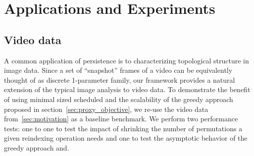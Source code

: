 \documentclass[sn-mathphys]{sn-jnl}
\begin{document}


\section{Applications and Experiments}\label{sec:results}
\subsection{Video data}
A common application of persistence is to characterizing topological structure in image data. Since a  set of ``snapshot'' frames of a video can be equivalently thought of as discrete 1-parameter family, our framework provides a natural extension of the typical image analysis to video data. 
To demonstrate the benefit of using minimal sized scheduled and the scalability of the greedy approach proposed in section~\ref{sec:proxy_objective}, we re-use the video data from~\ref{sec:motivation} as a baseline benchmark. We perform two performance tests: one to  one to test the impact of shrinking the number of permutations a given reindexing operation needs and one to test the asymptotic behavior of the greedy approach and. 
\end{document}

